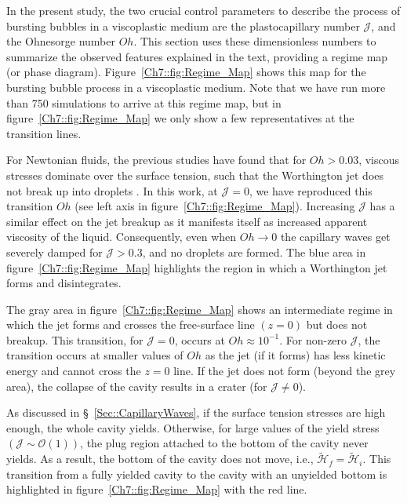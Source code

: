 In the present study, the two crucial control parameters to describe the process of bursting bubbles in a viscoplastic medium are the plastocapillary number $\mathcal{J}$, and the Ohnesorge number $Oh$. This section uses these dimensionless numbers to summarize the observed features explained in the text, providing a regime map (or phase diagram). Figure~\ref{Ch7::fig:Regime_Map} shows this map for the bursting bubble process in a viscoplastic medium. Note that we have run more than 750 simulations to arrive at this regime map, but in figure~\ref{Ch7::fig:Regime_Map} we only show a few representatives at the transition lines.

For Newtonian fluids, the previous studies have found that for $Oh > 0.03$, viscous stresses dominate over the surface tension, such that the Worthington jet does not break up into droplets \citep{san2011size, ghabache2014physics, walls2015jet}. In this work, at $\mathcal{J} = 0$, we have reproduced this transition $Oh$ (see left axis in figure~\ref{Ch7::fig:Regime_Map}). Increasing $\mathcal{J}$ has a similar effect on the jet breakup as it manifests itself as increased apparent viscosity of the liquid. Consequently, even when $Oh \to 0$ the capillary waves get severely damped for $\mathcal{J} > 0.3$, and no droplets are formed. The blue area in figure~\ref{Ch7::fig:Regime_Map} highlights the region in which a Worthington jet forms and disintegrates. 

The gray area in figure~\ref{Ch7::fig:Regime_Map} shows an intermediate regime in which the jet forms  and crosses the free-surface line $\left(z = 0\right)$ but does not breakup. This transition, for $\mathcal{J} = 0$, occurs at $Oh \approx 10^{-1}$. For non-zero $\mathcal{J}$, the transition occurs at smaller values of $Oh$  as the jet (if it forms) has less kinetic energy and cannot cross the $z = 0$ line. If the jet does not form (beyond the grey area), the collapse of the cavity results in a crater (for $\mathcal{J} \ne 0$). 

As discussed in \S~\ref{Sec::CapillaryWaves}, if the surface tension stresses are high enough, the whole cavity yields. Otherwise, for large values of the yield stress $\left(\mathcal{J} \sim \mathcal{O}\left(1\right)\right)$, the plug region attached to the bottom of the cavity never yields. As a result, the bottom of the cavity does not move, i.e., $\tilde{\mathcal{H}}_f = \tilde{\mathcal{H}}_i$. This transition from a fully yielded cavity to the cavity with an unyielded bottom is highlighted in figure~\ref{Ch7::fig:Regime_Map} with the red line.

